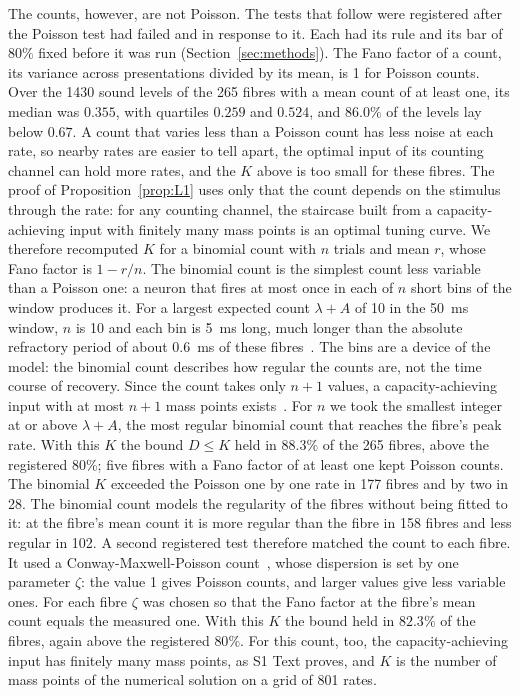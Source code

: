 \documentclass[10pt,letterpaper]{article}
\begin{document}
The counts, however, are not Poisson. The tests that follow were registered after the Poisson test had failed and in response to
it. Each had its rule and its bar of $80\%$ fixed before it was run (Section~\ref{sec:methods}). The Fano factor of a count, its variance across presentations divided by its mean, is 1 for
Poisson counts. Over the 1430 sound levels of the 265 fibres with a mean count of at least one, its median was $0.355$, with
quartiles $0.259$ and $0.524$, and $86.0\%$ of the levels lay below $0.67$. A count that varies less than a Poisson count has less
noise at each rate, so nearby rates are easier to tell apart, the optimal input of its counting channel can hold more rates, and the
$K$ above is too small for these fibres. The proof of Proposition~\ref{prop:L1} uses only that the count depends on the stimulus through the rate: for any counting
channel, the staircase built from a capacity-achieving input with finitely many mass points is an optimal tuning curve. We therefore
recomputed $K$ for a binomial count with $n$ trials and mean $r$, whose Fano factor is $1-r/n$. The binomial count is the simplest
count less variable than a Poisson one: a neuron that fires at most once in each of $n$ short bins of the window produces it. For a largest expected count $\lambda+A$ of 10 in the 50~ms window,
$n$ is 10 and each bin is 5~ms long, much longer than the absolute refractory period of about 0.6~ms of these fibres~\cite{Heeringa2024}.
The bins are a device of the model: the binomial count describes how regular the counts are, not the time course of recovery. Since the count takes only $n+1$
values, a capacity-achieving input with at most $n+1$ mass points exists~\cite{Favano2026}. For $n$ we took the smallest integer at
or above $\lambda+A$, the most regular binomial count that reaches the fibre's peak rate. With this $K$ the bound $D\le K$ held in
$88.3\%$ of the 265 fibres, above the registered $80\%$; five fibres with a Fano factor of at least one kept Poisson counts. The binomial $K$
exceeded the Poisson one by one rate in 177 fibres and by two in 28. The binomial count models the regularity of the fibres without
being fitted to it: at the fibre's mean count it is more regular than the fibre in 158 fibres and less regular in 102. A second
registered test therefore matched the count to each fibre. It used a Conway-Maxwell-Poisson count~\cite{Shmueli2005}, whose dispersion is set by one
parameter $\zeta$: the value 1 gives Poisson counts, and larger values give less variable ones. For each fibre $\zeta$ was chosen so
that the Fano factor at the fibre's mean count equals the measured one. With this $K$ the bound held in $82.3\%$ of the fibres, again
above the registered $80\%$. For this count, too, the capacity-achieving input has finitely many mass points, as S1 Text proves, and
$K$ is the number of mass points of the numerical solution on a grid of 801 rates.
\end{document}
